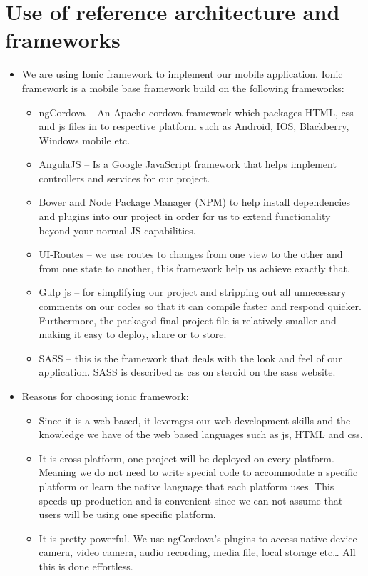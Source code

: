 \documentclass[a4paper,12pt]{article}
\begin{document}
\section{Use of reference architecture and frameworks}
\begin{itemize}
	\item We are using Ionic framework to implement our mobile application. Ionic framework is a mobile base framework build on the following frameworks:
	\begin{itemize}
		\item ngCordova – An Apache cordova framework which packages HTML, css and js files in to respective platform such as Android, IOS, Blackberry, Windows mobile etc.
		\item AngulaJS – Is a Google JavaScript framework that helps implement controllers and services 				for our project.
		\item Bower and Node Package Manager (NPM) to help install dependencies and plugins into our 		project in order for us to extend functionality beyond your normal JS capabilities.
		\item UI-Routes – we use routes to changes from one view to the other and from one state to another, this framework help us achieve exactly that.
		\item Gulp js – for simplifying our project and stripping out all unnecessary comments on our codes so that it can compile faster and respond quicker. Furthermore, the packaged final project file is relatively smaller and making it easy to deploy, share or to store.
		\item  SASS – this is the framework that deals with the look and feel of our application. SASS is described as css on steroid on the sass website.
	\end{itemize}
\item Reasons for choosing ionic framework:
	\begin{itemize}
		\item Since it is a web based, it leverages our web development skills and the knowledge we have of the web based languages such as js, HTML and css.
		\item It is cross platform, one project will be deployed on every platform. Meaning we do not need to write special code to accommodate a specific platform or learn the native language that each platform uses. This speeds up production and is convenient since we can not assume that users will be using one specific platform.
\item It is pretty powerful. We use ngCordova’s plugins to access native device camera, video camera, audio recording, media file, local storage etc… All this is done effortless.

\end{itemize}
\end{itemize}
\end{document}
